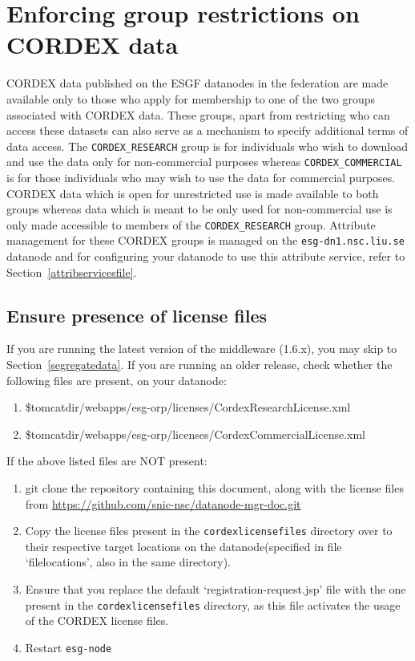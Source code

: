 \section{Enforcing group restrictions on CORDEX data}
\label{enforcegrouprestrictions}
CORDEX data published on the ESGF datanodes in the federation are made available only to those who apply for membership to one of the two groups associated with CORDEX data. These groups, apart from restricting who can access these datasets can also serve as a mechanism to specify additional terms of data access.  The \texttt{CORDEX\_RESEARCH} group is for individuals who wish to download and use the data only for non-commercial purposes whereas \texttt{CORDEX\_COMMERCIAL} is for those individuals who may wish to use the data for commercial purposes. CORDEX data which is open for unrestricted use is made available to both groups whereas data which is meant to be only used for non-commercial use is only made accessible to members of the \texttt{CORDEX\_RESEARCH} group.  Attribute management for these CORDEX groups is managed on the \texttt{esg-dn1.nsc.liu.se} datanode and for configuring your datanode to use this attribute service, refer to Section~\ref{attribservicesfile}.
\subsection{Ensure presence of license files}
If you are running the latest version of the middleware (1.6.x), you may skip to Section~\ref{segregatedata}. If you are running an older release, check whether the following files are present, on your datanode:
\begin{enumerate}
\item \$tomcatdir/webapps/esg-orp/licenses/CordexResearchLicense.xml
\item \$tomcatdir/webapps/esg-orp/licenses/CordexCommercialLicense.xml
\end{enumerate}
If the above listed files are NOT present:
\begin{enumerate}
\item git clone the repository containing this document, along with the license files from \url{https://github.com/snic-nsc/datanode-mgr-doc.git} 
\item Copy the license files present in the \texttt{cordexlicensefiles} directory over to their respective target locations on the datanode(specified in file `filelocations', also in the same directory). 
\item Ensure that you replace the default `registration-request.jsp' file with the one present in the \texttt{cordexlicensefiles} directory, as this file activates the usage of the CORDEX license files.
\item Restart \texttt{esg-node}
\end{enumerate}
